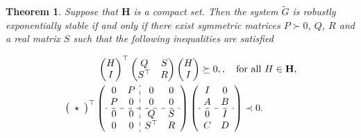 \documentclass[11pt,a4paper,oneside,DIV=12,headings=small]{scrartcl}
\newtheorem{theorem}{Theorem}[section]
\theoremstyle{plain}
\begin{document}
\begin{theorem}
\label{RobStability}
Suppose that $\mathbf{H}$ is a compact set. Then the system $\tilde{G}$ is robustly exponentially stable if and only if there exist symmetric matrices $P\succ 0$, $Q$, $R$ and a real matrix $S$ such that the following inequalities are satisfied

\begin{subequations}
\label{StabLMI}
\begin{align}
 & \quad \quad \quad \,\,\, \begin{pmatrix} H \\ I \end{pmatrix}^\top
 \begin{pmatrix} Q & S \\ S^\top & R \end{pmatrix} 
 \begin{pmatrix} H \\ I \end{pmatrix} \succeq 0, , \quad \text{for all}\,\, H \in \mathbf{H},\label{StabLMIa} \\
&\left(\begin{array}{c} 
\star 
\end{array}\right)^\top
\left(\begin{array}{cc:cc} 
0 & P & 0 & 0  \\ 
P & 0 & 0 & 0  \\ \hdashline 
0 & 0 & Q & S  \\
0 & 0 & S^\top & R
\end{array}\right)
\left(\begin{array}{cc} 
I & 0 \\ 
A & B  \\ \hdashline 
0 & I  \\
C & D 
\end{array}\right) \prec 0.  \label{StabLMIb}
\end{align}
\end{subequations}
 
\end{theorem}
\end{document}
